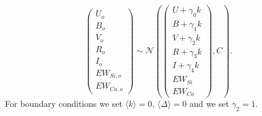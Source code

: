 \documentclass[11pt, oneside]{article}   	%
\begin{document}
\begin{equation*}
\left(
\begin{matrix}
U_o\\B_o\\ V_o\\R_o\\I_o\\EW_{Si, o}\\ EW_{Ca, o}
\end{matrix}
\right) \sim \mathcal{N}
\left(
\left(
\begin{matrix}
U +\gamma_0 k \\B +\gamma_1 k \\V+\gamma_2 k\\R+\gamma_3 k\\I+\gamma_4 k\\
EW_{Si}\\ EW_{Ca}
\end{matrix}
\right)
,C
\right).
\end{equation*}
For boundary conditions we set  $\langle k \rangle=0$, $\langle \Delta \rangle=0$ and we set $\gamma_2=1$.
\end{document}

